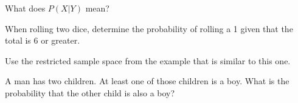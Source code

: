 \documentclass{ximera}
\begin{document}
\begin{question}
What does $P(X|Y)$ mean?

    \begin{multipleChoice}
    \end{multipleChoice}

\end{question}

\begin{question}
When rolling two dice, determine the probability of rolling a 1 given that the total is 6 or greater.

    \begin{multipleChoice}
    \end{multipleChoice}
    \begin{hint}
      Use the restricted sample space from the example that is similar to this one.
    \end{hint}

\end{question}

\begin{question}
A man has two children. At least one of those children is a boy. What is the probability that the other child is also a boy?

    \begin{multipleChoice}
    \end{multipleChoice}

\end{question}
\end{document}
